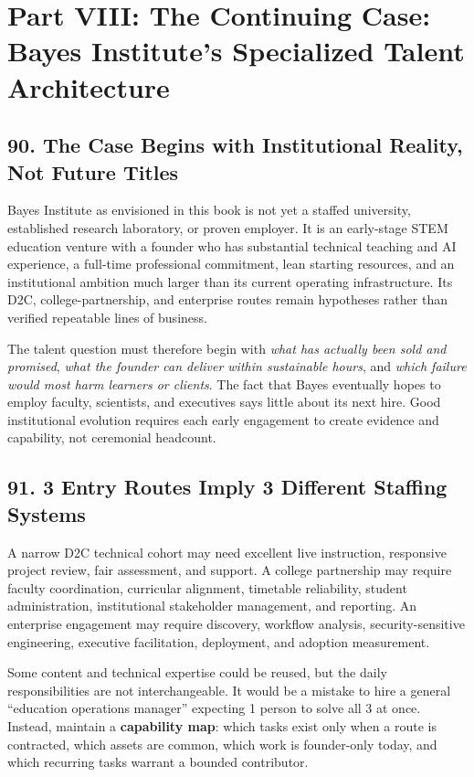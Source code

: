 \section*{Part VIII: The Continuing Case: Bayes Institute's Specialized Talent Architecture}

\subsection*{90. The Case Begins with Institutional Reality, Not Future Titles}

Bayes Institute as envisioned in this book is not yet a staffed university, established research laboratory, or proven employer. It is an early-stage STEM education venture with a founder who has substantial technical teaching and AI experience, a full-time professional commitment, lean starting resources, and an institutional ambition much larger than its current operating infrastructure. Its D2C, college-partnership, and enterprise routes remain hypotheses rather than verified repeatable lines of business.

The talent question must therefore begin with \textit{what has actually been sold and promised}, \textit{what the founder can deliver within sustainable hours}, and \textit{which failure would most harm learners or clients}. The fact that Bayes eventually hopes to employ faculty, scientists, and executives says little about its next hire. Good institutional evolution requires each early engagement to create evidence and capability, not ceremonial headcount.

\subsection*{91. 3 Entry Routes Imply 3 Different Staffing Systems}

A narrow D2C technical cohort may need excellent live instruction, responsive project review, fair assessment, and support. A college partnership may require faculty coordination, curricular alignment, timetable reliability, student administration, institutional stakeholder management, and reporting. An enterprise engagement may require discovery, workflow analysis, security-sensitive engineering, executive facilitation, deployment, and adoption measurement.

Some content and technical expertise could be reused, but the daily responsibilities are not interchangeable. It would be a mistake to hire a general ``education operations manager'' expecting 1 person to solve all 3 at once. Instead, maintain a \textbf{capability map}: which tasks exist only when a route is contracted, which assets are common, which work is founder-only today, and which recurring tasks warrant a bounded contributor.


